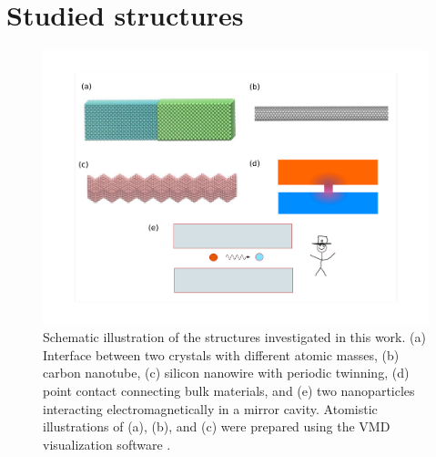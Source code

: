 


\section{Studied structures}

\begin{figure}
\begin{center}
 \includegraphics[width=1\columnwidth]{inkscape/systems.pdf} %
 \caption{Schematic illustration of the structures investigated in this work. (a) Interface between two crystals with different atomic masses, (b) carbon nanotube, (c) silicon nanowire with periodic twinning, (d) point contact connecting bulk materials, and (e) two nanoparticles interacting electromagnetically in a mirror cavity. Atomistic illustrations of (a), (b), and (c) were prepared using the VMD visualization software \cite{humphrey96}.}
\label{fig:intro_structures}
\end{center}
\end{figure}

